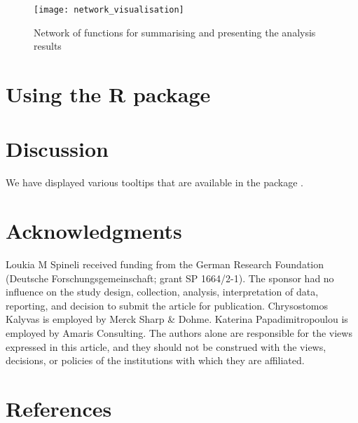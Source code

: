 \begin{figure}
\texttt{[image: network\_visualisation]} \caption{Network of functions for summarising and presenting the analysis results}\label{fig:network-visualisation}
\end{figure}

\hypertarget{using-the-r-package}{%
\section{\texorpdfstring{Using the  R package}{Using the  R package}}\label{using-the-r-package}}

\hypertarget{discussion}{%
\section{Discussion}\label{discussion}}

We have displayed various tooltips that are available in the package .

\hypertarget{acknowledgments}{%
\section{Acknowledgments}\label{acknowledgments}}

Loukia M Spineli received funding from the German Research Foundation (Deutsche Forschungsgemeinschaft; grant SP 1664/2-1). The sponsor had no influence on the study design, collection, analysis, interpretation of data, reporting, and decision to submit the article for publication. Chrysostomos Kalyvas is employed by Merck Sharp \& Dohme. Katerina Papadimitropoulou is employed by Amaris Consulting. The authors alone are responsible for the views expressed in this article, and they
should not be construed with the views, decisions, or policies of the institutions with which they are affiliated.

\hypertarget{references}{%
\section*{References}\label{references}}

